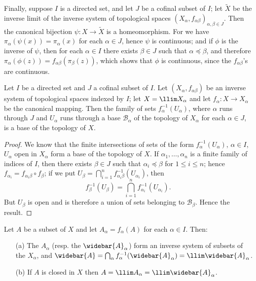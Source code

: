 Finally, suppose $I$ is a directed set, and let $J$ be a cofinal subset of $I$; let $\widetilde{X}$ be the inverse limit of the inverse system of topological spaces $(X_\alpha,f_{\alpha\beta})_{\alpha,\beta\in J}$. Then the canonical bijection $\psi:X\to\widetilde{X}$ is a homeomorphism. For we have $\pi_\alpha(\psi(x))=\pi_\alpha(x)$ for each $\alpha\in J$, hence $\psi$ is continuous; and if $\phi$ is the inverse of $\psi$, then for each $\alpha\in I$ there exists $\beta\in J$ such that $\alpha\preceq\beta$, and therefore $\pi_\alpha(\phi(z))=f_{\alpha\beta}(\pi_\beta(z))$, which shows that $\phi$ is continuous, since the $f_{\alpha\beta}$'s are continuous.
\begin{proposition}\label{topo space inverse limit cofinal system base}
Let $I$ be a directed set and $J$ a cofinal subset of $I$. Let $(X_\alpha,f_{\alpha\beta})$ be an inverse system of topological spaces indexed by $I$; let $X=\llim X_\alpha$ and let $f_\alpha:X\to X_\alpha$ be the canonical mapping. Then the family of sets $f_\alpha^{-1}(U_\alpha)$, where $\alpha$ runs through $J$ and $U_\alpha$ runs through a base $\mathcal{B}_\alpha$ of the topology of $X_\alpha$ for each $\alpha\in J$, is a base of the topology of $X$.
\end{proposition}
\begin{proof}
We know that the finite intersections of sets of the form $f_\alpha^{-1}(U_\alpha)$, $\alpha\in I$, $U_\alpha$ open in $X_\alpha$ form a base of the topology of $X$. If $\alpha_1,\dots,\alpha_n$ is a finite family of indices of $I$, then there exists $\beta\in J$ such that $\alpha_i\preceq\beta$ for $1\leq i\leq n$; hence $f_{\alpha_i}=f_{\alpha_i\beta}\circ f_\beta$; if we put $U_\beta=\bigcap_{i=1}^{n}f_{\alpha_i\beta}^{-1}(U_{\alpha_i})$, then
\[f_\beta^{-1}(U_\beta)=\bigcap_{i=1}^{n}f_{\alpha_i}^{-1}(U_{\alpha_i}).\]
But $U_\beta$ is open and is therefore a union of sets belonging to $\mathcal{B}_\beta$. Hence the result.
\end{proof}
\begin{corollary}
Let $A$ be a subset of $X$ and let $A_\alpha=f_\alpha(A)$ for each $\alpha\in I$. Then:
\begin{itemize}
\item[(a)] The $A_\alpha$ (resp. the $\widebar{A}_\alpha$) form an inverse system of subsets of the $X_\alpha$, and $\widebar{A}=\bigcap_{\alpha}f_\alpha^{-1}(\widebar{A}_\alpha)=\llim\widebar{A}_\alpha$.
\item[(b)] If $A$ is closed in $X$ then $A=\llim A_\alpha=\llim \widebar{A}_\alpha$.
\end{itemize}
\end{corollary}
